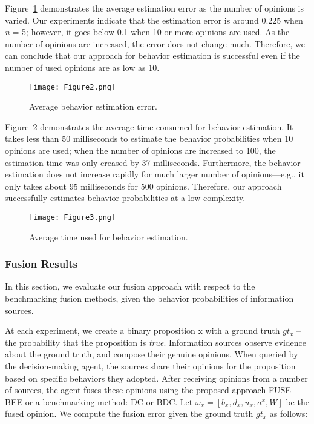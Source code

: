\documentclass[a4,12pt]{ozu-thesis}
\begin{document}
Figure~\ref{fig:behEstErr} demonstrates the average estimation error as the number of opinions is varied. Our experiments indicate that the estimation error is around 0.225 when \textit{n} = 5; however, it goes below 0.1 when 10 or more opinions are used. As the number of opinions are increased, the error does not change much. Therefore, we can conclude that our approach for behavior estimation is successful even if the number of used opinions are as low as 10.

\begin{figure}[h!]
\centering
\texttt{[image: Figure2.png]}
\caption{Average behavior estimation error.}
\label{fig:behEstErr}
\end{figure}

Figure~\ref{fig:avegTime} demonstrates the average time consumed for behavior estimation. It takes less than 50 milliseconds to estimate
the behavior probabilities when 10 opinions are used; when the number of opinions are increased to 100, the estimation
time was only creased by 37 milliseconds. Furthermore, the behavior estimation does not increase rapidly for much larger number of opinions—e.g., it only takes about 95 milliseconds for 500 opinions. Therefore, our approach successfully estimates behavior probabilities at a low complexity.

\begin{figure}[h]
\begin{center}
\texttt{[image: Figure3.png]}
\end{center}
\caption{Average time used for behavior estimation.}
\label{fig:avegTime}
\end{figure}

\subsubsection{Fusion Results}
In this section, we evaluate our fusion approach with respect to the benchmarking fusion methods, given the behavior probabilities of information sources.

At each experiment, we create a binary proposition x with a ground truth $gt_{x}$ – the probability that the proposition is \textit{true}. Information sources observe evidence about the ground truth, and compose their genuine opinions. When queried by the decision-making agent, the sources share their opinions for the proposition based on specific behaviors they adopted. After receiving opinions from a number of sources, the agent fuses these opinions using the proposed approach FUSE-BEE or a benchmarking method: DC or BDC. Let $\omega _{x} = \left [ b_{x}, d_{x}, u_{x}, a^{x}, W \right ]$ be the fused opinion. We compute the fusion error given the ground truth $gt_{x}$ as follows:
\end{document}
